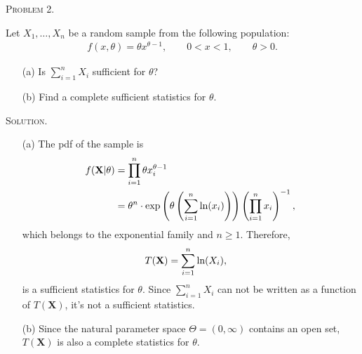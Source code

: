 \documentclass{article}
\begin{document}
\begin{CJK}{UTF8}{gbsn}
    \begin{shaded}
        \noindent\textsc{Problem 2.}\par
        Let $X_1,\ldots, X_n$ be a random sample from the following population:
        \begin{align}
            f(x,\theta) = \theta x^{\theta - 1}, \qquad 0 < x < 1, \qquad \theta > 0.
        \end{align}
        \begin{itemize}
            \item [(a)] Is $\sum_{i=1}^n X_i$ sufficient for $\theta$?
            \item [(b)] Find a complete sufficient statistics for $\theta$.
        \end{itemize}
    \end{shaded}
    \noindent\textsc{Solution.}\par
    \begin{itemize}
        \item [(a)]
              The pdf of the sample is
              \begin{align}
                  f(\mathbf{X}|\theta) & = \prod_{i=1}^n \theta x_i^{\theta - 1} \notag                                                                                                       \\
                                       & = \theta^n\cdot \textnormal{exp}\left (\theta \left (\sum_{i=1}^n \textnormal{ln}(x_i)\right )\right ) \left (\prod_{i=1}^n x_i\right )^{-1} ,\notag
              \end{align}
              which belongs to the exponential family and $n\geq 1$.
              Therefore,
              \begin{align}
                  T(\mathbf{X}) & = \sum_{i=1}^n \textnormal{ln}(X_i),
              \end{align}
              is a sufficient statistics for $\theta$.
              Since $\sum_{i=1}^n X_i$ can not be written as a function of $T(\mathbf{X})$, it's not a sufficient statistics.
        \item [(b)] Since the natural parameter space $\Theta = (0, \infty)$ contains an open set,
              $T(\mathbf{X})$ is also a complete statistics for $\theta$.
    \end{itemize}





\end{CJK}
\end{document}
